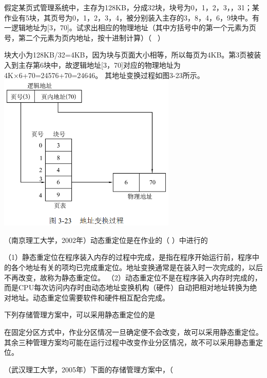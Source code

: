 \question 假定某页式管理系统中，主存为128KB，分成32块，块号为0，1，2，3，，31；某作业有5块，其页号为0，1，2，3，4，被分别装入主存的3，8，4，6，9块中。有一逻辑地址为{[}3，70{]}。试求出相应的物理地址（其中方括号中的第一个元素为页号，第二个元素为页内地址，按十进制计算）（
~）
\par{}
\begin{solution}块大小为128KB/32=4KB，因为块与页面大小相等，所以每页为4KB。第3页被装入到主存第6块中，故逻辑地址{[}3，70{]}对应的物理地址为4K×6+70=24576+70=24646。
其地址变换过程如图3-23所示。
\includegraphics[width=3.33333in,height=2.94792in]{computerassets/65E8216F2268DF223B4B882D04D1F7BE.png}
\end{solution}
\question （南京理工大学，2002年）动态重定位是在作业的（ ）中进行的
\par{}
\begin{solution}（1）静态重定位在程序装入内存的过程中完成，是指在程序开始运行前，程序中的各个地址有关的项均已完成重定位。地址变换通常是在装入时一次完成的，以后不再改变，故称为静态重定位。
（2）动态重定位不是在程序装入内存时完成的，而是CPU每次访问内存时由动态地址变换机构（硬件）自动把相对地址转换为绝对地址。动态重定位需要软件和硬件相互配合完成。
\end{solution}
\question 下列存储管理方案中，可以采用静态重定位的是
\par{}
\begin{solution}在固定分区方式中，作业分区情况一旦确定便不会改变，故可以采用静态重定位。其余三种管理方案均可能在运行过程中改变作业分区情况，故不可以采用静态重定位。
\end{solution}
\question （武汉理工大学，2005年）下面的存储管理方案中，（
